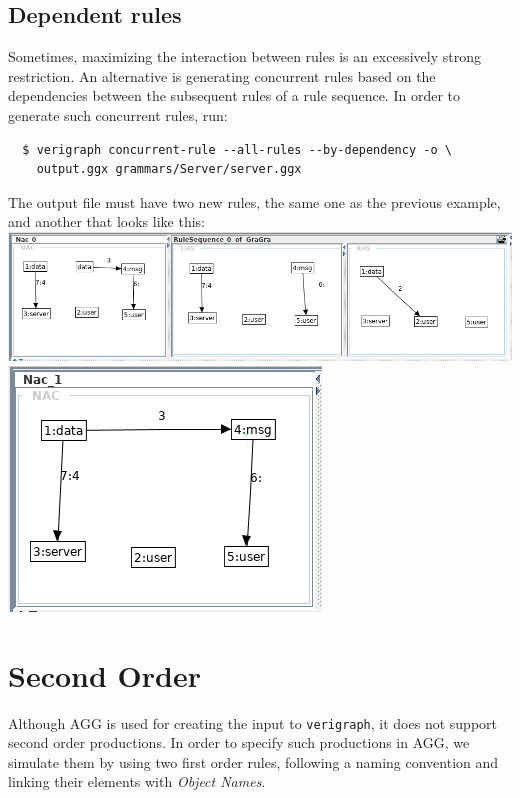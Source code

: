 \documentclass[12pt]{article}
\begin{document}
\subsection{Dependent rules}

Sometimes, maximizing the interaction between rules is an excessively strong restriction. An alternative is generating concurrent rules based on the dependencies between the subsequent rules of a rule sequence. In order to generate such concurrent rules, run:

\begin{verbatim}
  $ verigraph concurrent-rule --all-rules --by-dependency -o \ 
  	output.ggx grammars/Server/server.ggx
\end{verbatim}

The output file must have two new rules, the same one as the previous example, and another that looks like this:\\

\noindent
\includegraphics[scale = 0.4]{rule-sequence_05a.png}\\
\noindent
\includegraphics[scale = 0.4]{rule-sequence_05b.png}\\

\section{Second Order}

Although AGG is used for creating the input to \texttt{verigraph}, it does not support second order productions. In order to specify such productions in AGG, we simulate them by using two first order rules, following a naming convention and linking their elements with \emph{Object Names}.\\
\end{document}
